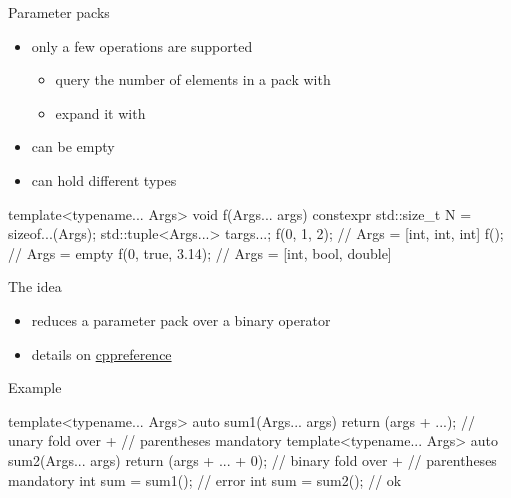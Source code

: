 \begin{frame}[fragile]
  \begin{block}{Parameter packs}
    \begin{itemize}
      \item only a few operations are supported
      \begin{itemize}
        \item query the number of elements in a pack with 
        \item expand it with 
      \end{itemize}
      \item can be empty
      \item can hold different types
    \end{itemize}
  \end{block}
  \begin{exampleblock}{}
    \begin{cppcode*}{}
      template<typename... Args>
      void f(Args... args) {
        constexpr std::size_t N = sizeof...(Args);
        std::tuple<Args...> t{args...};
      }
      f(0, 1, 2);       // Args = [int, int, int]
      f();              // Args = empty
      f(0, true, 3.14); // Args = [int, bool, double]
    \end{cppcode*}
  \end{exampleblock}
\end{frame}

\begin{frame}[fragile]
  \begin{block}{The idea}
    \begin{itemize}
      \item reduces a parameter pack over a binary operator
      \item details on \href{https://en.cppreference.com/w/cpp/language/fold}{cppreference}
    \end{itemize}
  \end{block}
  \begin{exampleblock}{Example}
    \begin{cppcode*}{}
      template<typename... Args>
      auto sum1(Args... args) {
        return (args + ...);     // unary fold over +
      }                          // parentheses mandatory
      template<typename... Args>
      auto sum2(Args... args) {
        return (args + ... + 0); // binary fold over +
      }                          // parentheses mandatory
      int sum = sum1(); // error
      int sum = sum2(); // ok
    \end{cppcode*}
  \end{exampleblock}
\end{frame}

